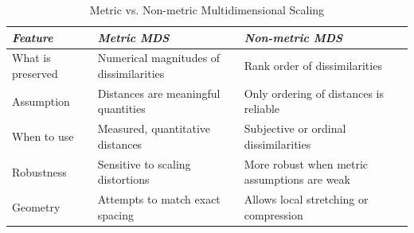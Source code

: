 \begin{table}[H]
\centering
\renewcommand{\arraystretch}{1.5}
\begin{tabularx}{0.9\textwidth}{l X X}
\toprule
\textit{Feature} 
& \textit{Metric MDS} 
& \textit{Non-metric MDS} \\
\midrule
What is preserved 
& Numerical magnitudes of dissimilarities 
& Rank order of dissimilarities \\

Assumption 
& Distances are meaningful quantities 
& Only ordering of distances is reliable \\

When to use 
& Measured, quantitative distances 
& Subjective or ordinal dissimilarities \\

Robustness 
& Sensitive to scaling distortions 
& More robust when metric assumptions are weak \\

Geometry 
& Attempts to match exact spacing 
& Allows local stretching or compression \\
\bottomrule
\end{tabularx}
\caption*{Metric vs. Non-metric Multidimensional Scaling}
\end{table}

